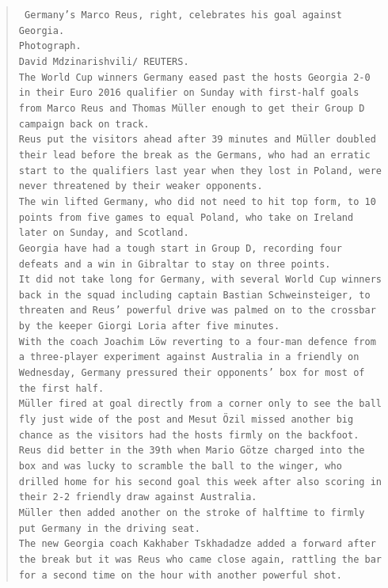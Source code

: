 \documentclass[a4paper, 12pt]{article}
\begin{document}
\begin{quotation}
\texttt{
Germany's Marco Reus,  right,  celebrates his goal against Georgia.\\
Photograph.\\
David Mdzinarishvili/ REUTERS.\\
The World Cup winners Germany eased past the hosts Georgia 2-0 in their Euro 2016 qualifier on Sunday with first-half goals from Marco Reus and Thomas Müller enough to get their Group D campaign back on track.\\
Reus put the visitors ahead after 39 minutes and Müller doubled their lead before the break as the Germans,  who had an erratic start to the qualifiers last year when they lost in Poland,  were never threatened by their weaker opponents.\\
The win lifted Germany,  who did not need to hit top form,  to 10 points from five games to equal Poland,  who take on Ireland later on Sunday,  and Scotland.\\
Georgia have had a tough start in Group D,  recording four defeats and a win in Gibraltar to stay on three points.\\
It did not take long for Germany,  with several World Cup winners back in the squad including captain Bastian Schweinsteiger,  to threaten and Reus’ powerful drive was palmed on to the crossbar by the keeper Giorgi Loria after five minutes.\\
With the coach Joachim Löw reverting to a four-man defence from a three-player experiment against Australia in a friendly on Wednesday,  Germany pressured their opponents’ box for most of the first half.\\
Müller fired at goal directly from a corner only to see the ball fly just wide of the post and Mesut Özil missed another big chance as the visitors had the hosts firmly on the backfoot.\\
Reus did better in the 39th when Mario Götze charged into the box and was lucky to scramble the ball to the winger,  who drilled home for his second goal this week after also scoring in their 2-2 friendly draw against Australia.\\
Müller then added another on the stroke of halftime to firmly put Germany in the driving seat.\\
The new Georgia coach Kakhaber Tskhadadze added a forward after the break but it was Reus who came close again,  rattling the bar for a second time on the hour with another powerful shot.\\
}
\end{quotation}
\end{document}
